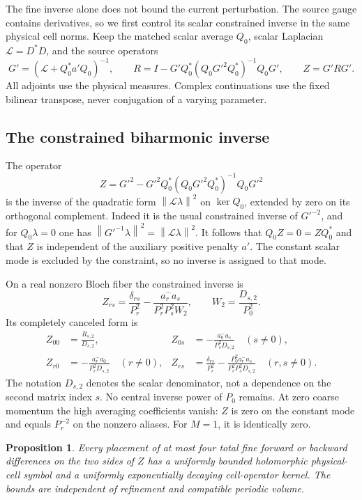 \documentclass[11pt]{article}
\newtheorem{proposition}[theorem]{Proposition}
\theoremstyle{remark}
\newcommand{\norm}[1]{\left\|#1\right\|}
\begin{document}
The fine inverse alone does not bound the current perturbation.
The source gauge contains derivatives, so we first control its
scalar constrained inverse in the same physical cell norms.
Keep the matched scalar average $Q_0$, scalar Laplacian
$\mathcal L=D^*D$, and the source operators
\[
 G'=(\mathcal L+Q_0^*a'Q_0)^{-1},\qquad
 R=I-G'Q_0^*(Q_0G'^2Q_0^*)^{-1}Q_0G',
 \qquad Z=G'RG'.
\]
All adjoints use the physical measures. Complex continuations use
the fixed bilinear transpose, never conjugation of a varying parameter.

\subsection{The constrained biharmonic inverse}

The operator
\[
 Z=G'^2-G'^2Q_0^*(Q_0G'^2Q_0^*)^{-1}Q_0G'^2
\]
is the inverse of the quadratic form $\norm{\mathcal L\lambda}^2$
on $\ker Q_0$, extended by zero on its orthogonal complement.
Indeed it is the usual constrained inverse of $G'^{-2}$, and for
$Q_0\lambda=0$ one has
$\norm{G'^{-1}\lambda}^2=\norm{\mathcal L\lambda}^2$.
It follows that $Q_0Z=0=ZQ_0^*$ and that $Z$ is independent of
the auxiliary positive penalty $a'$. The constant scalar mode is
excluded by the constraint, so no inverse is assigned to that mode.

On a real nonzero Bloch fiber the constrained inverse is
\[
 Z_{rs}=\frac{\delta_{rs}}{P_r^2}
 -\frac{a_r^-a_s}{P_r^2P_s^2W_2},
 \qquad W_2=\frac{D_{s,2}}{P_0^2}.
\]
Its completely canceled form is
\begin{align}
 Z_{00}&=\frac{R_{s,2}}{D_{s,2}},
 &Z_{0s}&=-\frac{a_0^-a_s}{P_s^2D_{s,2}}\quad(s\ne0),
 \label{gauge-Z-central}\\
 Z_{r0}&=-\frac{a_r^-a_0}{P_r^2D_{s,2}}\quad(r\ne0),
 &Z_{rs}&=\frac{\delta_{rs}}{P_r^2}
       -\frac{P_0^2a_r^-a_s}{P_r^2P_s^2D_{s,2}}
          \quad(r,s\ne0).
 \label{gauge-Z-high}
\end{align}
The notation $D_{s,2}$ denotes the scalar denominator, not a
dependence on the second matrix index $s$. No central inverse
power of $P_0$ remains. At zero coarse momentum the high averaging
coefficients vanish: $Z$ is zero on the constant mode and equals
$P_r^{-2}$ on the nonzero aliases. For $M=1$, it is identically zero.

\begin{proposition}\label{gauge-Z-locality}
Every placement of at most four total fine forward or backward
differences on the two sides of $Z$ has a uniformly bounded
holomorphic physical-cell symbol and a uniformly exponentially
decaying cell-operator kernel. The bounds are independent of
refinement and compatible periodic volume.
\end{proposition}
\end{document}
